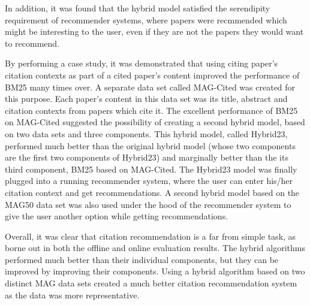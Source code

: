 In addition, it was found that the hybrid model satisfied the serendipity requirement of recommender systems, where papers were recmmended which might be interesting to the user, even if they are not the papers they would want to recommend.

By performing a case study, it was demonstrated that using citing paper's citation contexts as part of a cited paper's content improved the performance of BM25 many times over. A separate data set called MAG-Cited was created for this purpose. Each paper's content in this data set was its title, abstract and citation contexts from papers which cite it. The excellent performance of BM25 on MAG-Cited suggested the possibility of creating a second hybrid model, based on two data sets and three components. This hybrid model, called Hybrid23, performed much better than the original hybrid model (whose two components are the first two components of Hybrid23) and marginally better than the its third component, BM25 based on MAG-Cited.
The Hybrid23 model was finally plugged into a running recommender system, where the user can enter his/her citation context and get recommendations. A second hybrid model based on the MAG50 data set was also used under the hood of the recommender system to give the user another option while getting recommendations.

Overall, it was clear that citation recommendation is a far from simple task, as borne out in both the offline and online evaluation results. The hybrid algorithms performed much better than their individual components, but they can be improved by improving their components. Using a hybrid algorithm based on two distinct MAG data sets created a much better citation recommendation system as the data was more representative.